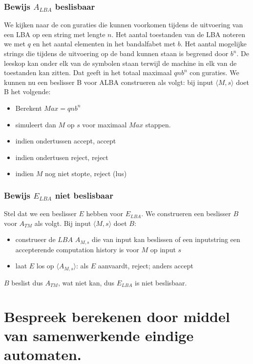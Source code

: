 \documentclass{article}
\begin{document}
        \subsubsection{Bewijs $A_{LBA}$ beslisbaar}
            We kijken naar de conguraties die kunnen voorkomen tijdens de uitvoering van een LBA op een string met lengte $n$. Het aantal toestanden van de LBA noteren we met $q$ en het aantal elementen in het bandalfabet met $b$. Het aantal mogelijke strings die tijdens de uitvoering op de band kunnen staan is begrensd door $b^n$. De leeskop kan onder elk van de symbolen staan terwijl de machine in elk van de toestanden kan zitten. Dat geeft in het totaal maximaal $qnb^n$ conguraties.
            We kunnen nu een beslisser B voor ALBA construeren als volgt: bij input $\langle M, s \rangle$ doet B het volgende:
            \begin{itemize}
                \item Berekent $Max=qnb^n$
                \item simuleert dan $M$ op $s$ voor maximaal $Max$ stappen.
                \item indien ondertussen accept, accept
                \item indien ondertusen reject, reject
                \item indien $M$ nog niet stopte, reject (lus)
            \end{itemize}
        \subsubsection{Bewijs $E_{LBA}$ niet beslisbaar}
            Stel dat we een beslisser $E$ hebben voor $E_{LBA}$. We construeren een beslisser $B$ voor $A_{TM}$ als volgt. Bij input $\langle M, s \rangle $ doet $B$:
            \begin{itemize}
                \item construeer de $LBA$ $A_{M,s}$ die van input kan beslissen of een inputstring een accepterende computation history is voor $M$ op input $s$
                \item laat $E$ los op $\langle A_{M,s} \rangle$: als $E$ aanvaardt, reject; anders accept
            \end{itemize}
            $B$ beslist dus $A_{TM}$, wat niet kan, dus $E_{LBA}$ is niet beslisbaar.



\newpage
\section{Bespreek berekenen door middel van samenwerkende eindige automaten.}
\end{document}
